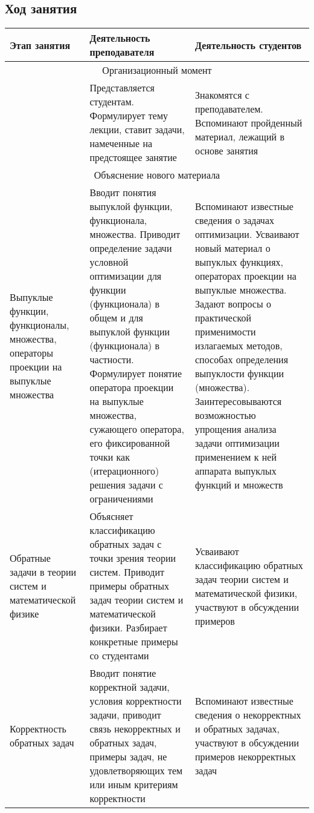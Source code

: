 \begin{refsection}
\subsection{Ход занятия}

\noindent\begin{longtable}{| p{} | p{} | p{} |}\hline
    {\textbf{Этап занятия}} &
    {\textbf{Деятельность преподавателя}} &
    {\textbf{Деятельность студентов}} \\ \hline

    \multicolumn{3}{|c|}{Организационный момент} \\ \hline

    {} &
    {Представляется студентам. Формулирует тему лекции, ставит задачи, намеченные на предстоящее занятие} &
    {Знакомятся с преподавателем. Вспоминают пройденный материал, лежащий в основе занятия} \\ \hline

    \multicolumn{3}{|c|}{Объяснение нового материала} \\ \hline

    {Выпуклые функции, функционалы, множества, операторы проекции на выпуклые множества} &
    {Вводит понятия выпуклой функции, функционала, множества. Приводит определение задачи условной оптимизации для функции (функционала) в общем и для выпуклой функции (функционала) в частности. Формулирует понятие оператора проекции на выпуклые множества, сужающего оператора, его фиксированной точки как (итерационного) решения задачи с ограничениями} &
    {Вспоминают известные сведения о задачах оптимизации. Усваивают новый материал о выпуклых функциях, операторах проекции на выпуклые множества. Задают вопросы о практической применимости излагаемых методов, способах определения выпуклости функции (множества). Заинтересовываются возможностью упрощения анализа задачи оптимизации применением к ней аппарата выпуклых функций и множеств} \\ \hline

    {Обратные задачи в теории систем и математической физике} &
    {Объясняет классификацию обратных задач с точки зрения теории систем. Приводит примеры обратных задач теории систем и математической физики. Разбирает конкретные примеры со студентами} &
    {Усваивают классификацию обратных задач теории систем и математической физики, участвуют в обсуждении примеров} \\ \hline

    {Корректность обратных задач} &
    {Вводит понятие корректной задачи, условия корректности задачи, приводит связь некорректных и обратных задач, примеры задач, не удовлетворяющих тем или иным критериям корректности} &
    {Вспоминают известные сведения о некорректных и обратных задачах, участвуют в обсуждении примеров некорректных задач} \\ \hline
\end{longtable}


\end{refsection}
